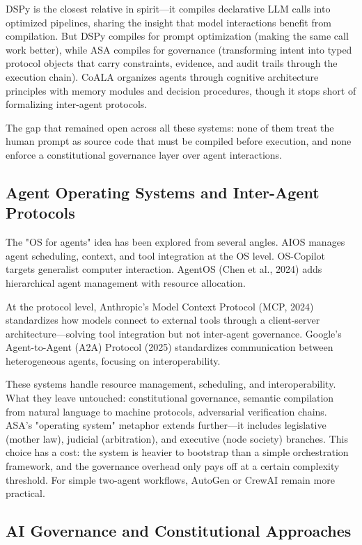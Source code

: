 \documentclass[12pt,a4paper]{article}
\begin{document}
DSPy \cite{ref21} is the closest relative in spirit---it compiles declarative LLM calls into optimized pipelines, sharing the insight that model interactions benefit from compilation. But DSPy compiles for prompt optimization (making the same call work better), while ASA compiles for governance (transforming intent into typed protocol objects that carry constraints, evidence, and audit trails through the execution chain). CoALA \cite{ref22} organizes agents through cognitive architecture principles with memory modules and decision procedures, though it stops short of formalizing inter-agent protocols.

The gap that remained open across all these systems: none of them treat the human prompt as source code that must be compiled before execution, and none enforce a constitutional governance layer over agent interactions.

\subsection{Agent Operating Systems and Inter-Agent Protocols}


The "OS for agents" idea has been explored from several angles. AIOS \cite{ref9} manages agent scheduling, context, and tool integration at the OS level. OS-Copilot \cite{ref13} targets generalist computer interaction. AgentOS (Chen et al., 2024) adds hierarchical agent management with resource allocation.

At the protocol level, Anthropic's Model Context Protocol (MCP, 2024) standardizes how models connect to external tools through a client-server architecture---solving tool integration but not inter-agent governance. Google's Agent-to-Agent (A2A) Protocol (2025) standardizes communication between heterogeneous agents, focusing on interoperability.

These systems handle resource management, scheduling, and interoperability. What they leave untouched: constitutional governance, semantic compilation from natural language to machine protocols, adversarial verification chains. ASA's "operating system" metaphor extends further---it includes legislative (mother law), judicial (arbitration), and executive (node society) branches. This choice has a cost: the system is heavier to bootstrap than a simple orchestration framework, and the governance overhead only pays off at a certain complexity threshold. For simple two-agent workflows, AutoGen or CrewAI remain more practical.

\subsection{AI Governance and Constitutional Approaches}
\end{document}
